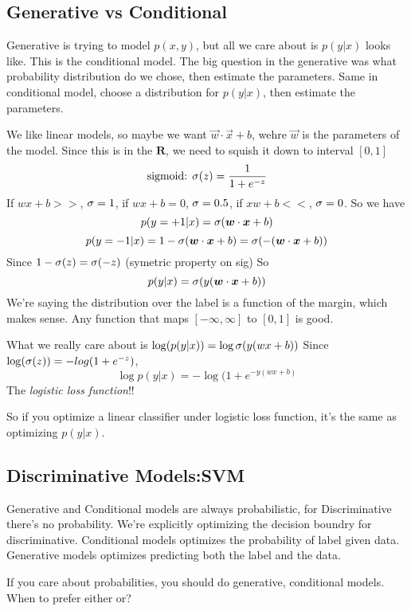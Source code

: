 \subsection{Generative vs Conditional}
Generative is trying to model $p(x,y)$, but all we care about is
$p(y|x)$ looks like. This is the conditional model.
The big question in the generative was what probability distribution
do we chose, then estimate the parameters. Same in conditional model,
choose a distribution for $p(y|x)$, then estimate the parameters.

We like linear models, so maybe we want $\vec w \cdot \vec x + b$,
wehre $\vec w$ is the parameters of the model. Since this is in the
$\mathbf{R}$, we need to squish it down to interval $[0,1]$
$$\text{sigmoid: } \sigma(z) = \frac{1}{1+e^{-z}}$$
If $wx+b>>$, $\sigma = 1$, if $wx+b = 0$, $\sigma = 0.5$, if $xw+b << $,
$\sigma = 0$. 
So we have $$p(y=+1|x) = \sigma(\boldsymbol{w} \cdot \boldsymbol{x} + b)$$
$$p(y=-1|x) = 1-\sigma(\boldsymbol{w} \cdot \boldsymbol{x} + b) = \sigma(-(\boldsymbol{w} \cdot \boldsymbol{x} + b))$$ Since $1-\sigma(z) =
\sigma(-z)$ (symetric property on sig)
So $$p(y|x) = \sigma(y(\boldsymbol{w} \cdot \boldsymbol{x} + b))$$
We're saying the distribution over the label is a function of the
margin, which makes sense. Any function that maps $[-\infty, \infty]$
to $[0,1]$ is good.

What we really care about is $\log(p(y|x)) = \log \sigma(y(wx+b))$
Since $\log(\sigma(z)) = -log(1+e^{-z})$, 
$$\log p(y|x) = -\log (1+e^{-y(wx+b)}$$ The \emph{logistic loss
  function}!!

So if you optimize a linear classifier under logistic loss function,
it's the same as optimizing $p(y|x)$.

\subsection{Discriminative Models:SVM}
Generative and Conditional models are always probabilistic, for
Discriminative there's no probability. We're explicitly optimizing the
decision boundry for discriminative.
Conditional models optimizes the probability of label given data.
Generative models optimizes predicting both the label and the data.

If you care about probabilities, you should do generative, conditional
models. When to prefer either or? 

